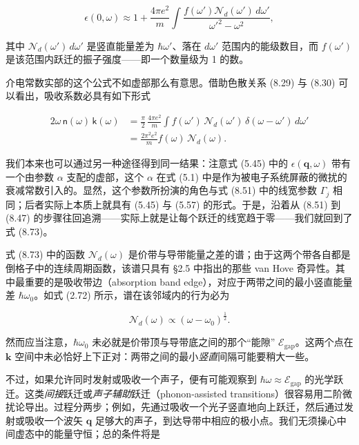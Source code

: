 \begin{equation*}
\epsilon(0,\omega) \approx 1 + \frac{4\pi e^2}{m} \int \frac{f(\omega')\mathcal{N}_d(\omega')\,d\omega'}{\omega'^2-\omega^2},
\tag{8.72}
\end{equation*}

其中 $\mathcal{N}_d(\omega')\,d\omega'$ 是竖直能量差为 $\hbar\omega'$、落在 $d\omega'$ 范围内的能级数目，而 $f(\omega')$ 是该范围内跃迁的振子强度——即一个数量级为 1 的数。

介电常数实部的这个公式不如虚部那么有意思。借助色散关系 (8.29) 与 (8.30) 可以看出，吸收系数必具有如下形式

\begin{align*}
2\omega\,\mathsf{n}(\omega)\,\mathsf{k}(\omega) &= \frac{\pi}{2}\,\frac{4\pi e^2}{m} \int f(\omega')\,\mathcal{N}_d(\omega')\,\delta(\omega-\omega')\,d\omega' \\
&= \frac{2\pi^2 e^2}{m} f(\omega)\,\mathcal{N}_d(\omega).
\tag{8.73}
\end{align*}

我们本来也可以通过另一种途径得到同一结果：注意式 (5.45) 中的 $\epsilon(\mathbf{q},\omega)$ 带有一个由参数 $\alpha$ 支配的虚部，这个 $\alpha$ 在式 (5.1) 中是作为被电子系统屏蔽的微扰的衰减常数引入的。显然，这个参数所扮演的角色与式 (8.51) 中的线宽参数 $\Gamma_j$ 相同；后者实际上本质上就具有 (5.45) 与 (5.57) 的形式。于是，沿着从 (8.51) 到 (8.47) 的步骤往回追溯——实际上就是让每个跃迁的线宽趋于零——我们就回到了式 (8.73)。

式 (8.73) 中的函数 $\mathcal{N}_d(\omega)$ 是价带与导带能量之差的谱；由于这两个带各自都是倒格子中的连续周期函数，该谱只具有 §2.5 中指出的那些 van Hove 奇异性。其中最重要的是吸收带边（absorption band edge），对应于两带之间的最小竖直能量差 $\hbar\omega_0$。如式 (2.72) 所示，谱在该邻域内的行为必为

\begin{equation*}
\mathcal{N}_d(\omega) \propto (\omega-\omega_0)^{\frac{1}{2}}.
\tag{8.74}
\end{equation*}

然而应当注意，$\hbar\omega_0$ 未必就是价带顶与导带底之间的那个“能隙” $\mathcal{E}_{\mathrm{gap}}$。这两个点在 $\mathbf{k}$ 空间中未必恰好上下正对：两带之间的最小\emph{竖直}间隔可能要稍大一些。


不过，如果允许同时发射或吸收一个声子，便有可能观察到 $\hbar\omega\approx\mathcal{E}_{\mathrm{gap}}$ 的光学跃迁。这类\emph{间接}跃迁或\emph{声子辅助}跃迁（phonon-assisted transitions）很容易用二阶微扰论导出。过程分两步；例如，先通过吸收一个光子竖直地向上跃迁，然后通过发射或吸收一个波矢 $\mathbf{q}$ 足够大的声子，到达导带中相应的极小点。我们无须操心中间虚态中的能量守恒；总的条件将是


